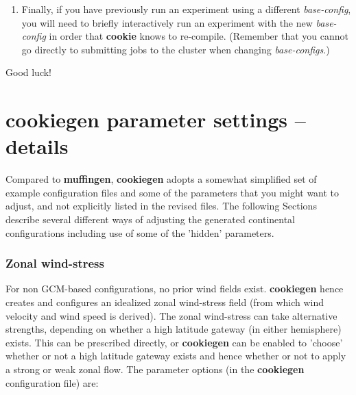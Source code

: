 \begin{enumerate}[noitemsep]
\\ Sometimes it is best simply to start the experiment running and see what happens -- there are checks (not comprehensive) in the code to see if you have the necessary tracers selected. Read any warnings that are reported as the experiment initializes, but often you can ignore these.
\\\uline{Ensure} that the total number of defined tracers equals the number of selected tracers you have listed (plus temperature and salinity) in the \textit{base-config.}
\vspace{1mm}
\item Finally, if you have previously run an experiment using a different \textit{base-config}, you will need to briefly interactively run an experiment with the new \textit{base-config} in order that \textbf{cookie} knows to re-compile. (Remember that you cannot go directly to submitting jobs to the cluster when changing \textit{base-configs}.)
\end{enumerate}

\vspace{2mm}
Good luck!

\newpage

\section{cookiegen parameter settings -- details}

Compared to \textbf{muffingen}, \textbf{cookiegen} adopts a somewhat simplified set of example configuration files and some of the parameters that you might want to adjust, and not explicitly listed in the revised files. The following Sections describe several different ways of adjusting the generated continental configurations including use of some of the 'hidden' parameters.

\subsubsection{Zonal wind-stress}

For non GCM-based configurations, no prior wind fields exist. \textbf{cookiegen} hence creates and configures an idealized zonal wind-stress field (from which wind velocity and wind speed is derived). The zonal wind-stress can take alternative strengths, depending on whether a high latitude gateway (in either hemisphere) exists. This can be prescribed directly, or \textbf{cookiegen} can be enabled to 'choose' whether or not a high latitude gateway exists and hence whether or not to apply a strong or weak zonal flow. The parameter options (in the \textbf{cookiegen} configuration file) are:

